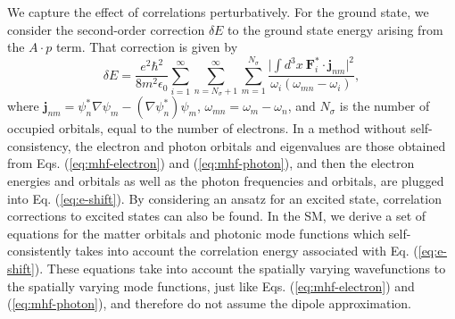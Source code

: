 \documentclass[aps,prl,twocolumn,
	groupedaddress,superscriptaddress,
	amsfonts,amssymb,amsmath,floatfix,
	citeautoscript]{revtex4-1}
\begin{document}
We capture the effect of correlations perturbatively. For the ground state, we consider the second-order correction $\delta E$ to the ground state energy arising from the $A\cdot p$ term. That correction is given by 
\begin{equation}
\delta E = \frac{e^2\hbar^2}{8m^2\epsilon_0}\sum\limits_{i=1}^{\infty}\sum_{n=N_{\sigma}+1}^{\infty}\sum\limits_{m=1}^{N_{\sigma}} \frac{\Big| \int d^3x~\mathbf{F}_i^*\cdot\mathbf{j}_{nm}\Big|^2}{\omega_i(\omega_{mn} -\omega_i)},
\label{eq:e-shift}
\end{equation}
where $\mathbf{j}_{nm} = \psi^*_n\nabla\psi_m - (\nabla\psi^*_n)\psi_m$, $\omega_{mn} = \omega_m - \omega_n$, and $N_{\sigma}$ is the number of occupied orbitals, equal to the number of electrons.  In a method without self-consistency, the electron and photon orbitals and eigenvalues are those obtained from Eqs. (\ref{eq:mhf-electron}) and (\ref{eq:mhf-photon}), and then the electron energies and orbitals as well as the photon frequencies and orbitals, are plugged into Eq. (\ref{eq:e-shift}). By considering an ansatz for an excited state, correlation corrections to excited states can also be found. In the SM, we derive a set of equations for the matter orbitals and photonic mode functions which self-consistently takes into account the correlation energy associated with Eq. (\ref{eq:e-shift}). These equations take into account the spatially varying wavefunctions to the spatially varying mode functions, just like Eqs. (\ref{eq:mhf-electron}) and (\ref{eq:mhf-photon}), and therefore do not assume the dipole approximation.
\end{document}
